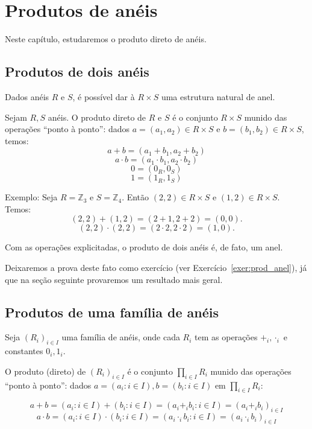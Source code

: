 \chapter{Produtos de anéis}
Neste capítulo, estudaremos o produto direto de anéis.

\section{Produtos de dois anéis}
Dados anéis $R$ e $S$, é possível dar à $R\times S$ uma estrutura natural de anel.
\begin{definition}
    Sejam $R, S$ anéis.
    O produto direto de $R$ e $S$ é o conjunto $R\times S$ munido das operações ``ponto à ponto'': dados $a=(a_1, a_2)\in R\times S$ e $b=(b_1, b_2)\in R\times S$, temos:
    \[a+b=(a_1+b_1, a_2+b_2)\]
    \[a\cdot b=(a_1\cdot b_1, a_2\cdot b_2)\]
    \[0=(0_R, 0_S)\]
    \[1=(1_R, 1_S)\]
\end{definition}

Exemplo: Seja $R=\mathbb Z_3$ e $S=\mathbb Z_4$. Então $(2, 2)\in R\times S$ e $(1, 2)\in R\times S$. Temos:
\[(2, 2)+(1, 2)=(2+ 1, 2+ 2)=(0, 0).\]
\[(2, 2)\cdot (2, 2)=(2\cdot 2, 2\cdot 2)=(1, 0).\]

Com as operações explicitadas, o produto de dois anéis é, de fato, um anel.

Deixaremos a prova deste fato como exercício (ver Exercício~\ref{exer:prod_anel}), já que na seção seguinte provaremos um resultado mais geral.

\section{Produtos de uma família de anéis}

\begin{definition}
    Seja $(R_i)_{i \in I}$ uma família de anéis, onde cada $R_i$ tem as operações $+_i, \cdot_i$ e constantes $0_i, 1_i$.
    
    O produto (direto) de $(R_i)_{i \in I}$ é o conjunto $\prod_{i \in I} R_i$ munido das operações ``ponto à ponto'': dados $a=(a_i: i \in I), b=(b_i: i \in I)$ em $\prod_{i \in I}R_i$:

    $$a+b=(a_i: i \in I)+(b_i: i \in I)=(a_i+_i b_i: i \in I)=(a_i+_ib_i)_{i \in I}$$
    $$a\cdot b=(a_i: i \in I)\cdot (b_i: i \in I)=(a_i\cdot _i b_i: i \in I)=(a_i\cdot _ib_i)_{i \in I}$$

\end{definition}

